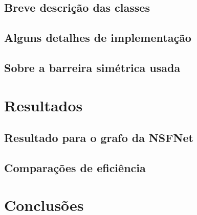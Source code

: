 \documentclass[a4paper,11pt]{article}
\begin{document}
  \subsection{Breve descrição das classes}

  \subsection{Alguns detalhes de implementação}

  \subsection{Sobre a barreira simétrica usada}

\section{Resultados}

  \subsection{Resultado para o grafo da NSFNet}

  \subsection{Comparações de eficiência}

\section{Conclusões}
\end{document}
